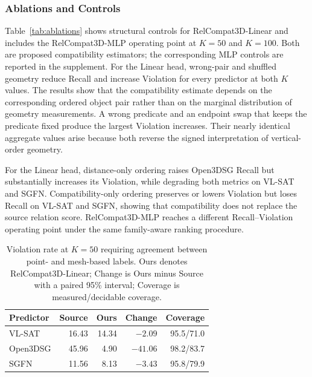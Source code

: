 \subsubsection{Ablations and Controls}
Table~\ref{tab:ablations} shows structural controls for RelCompat3D-Linear and includes the RelCompat3D-MLP operating point at $K=50$ and $K=100$. Both are proposed compatibility estimators; the corresponding MLP controls are reported in the supplement. For the Linear head, wrong-pair and shuffled geometry reduce Recall and increase Violation for every predictor at both $K$ values. The results show that the compatibility estimate depends on the corresponding ordered object pair rather than on the marginal distribution of geometry measurements. A wrong predicate and an endpoint swap that keeps the predicate fixed produce the largest Violation increases. Their nearly identical aggregate values arise because both reverse the signed interpretation of vertical-order geometry. 

For the Linear head, distance-only ordering raises Open3DSG Recall but substantially increases its Violation, while degrading both metrics on VL-SAT and SGFN. Compatibility-only ordering preserves or lowers Violation but loses Recall on VL-SAT and SGFN, showing that compatibility does not replace the source relation score. RelCompat3D-MLP reaches a different Recall--Violation operating point under the same family-aware ranking procedure. 

\begin{table}[t]
    \centering
    {\small
    \setlength{\tabcolsep}{1.5pt}
    \begin{tabular}{@{}lrrrr@{}}
    \toprule
    Predictor & Source & Ours & Change & Coverage \\
    \midrule
    VL-SAT   & 16.43 & 14.34 & $-2.09$ & 95.5/71.0 \\
    Open3DSG & 45.96 & 4.90  & $-41.06$ & 98.2/83.7 \\
    SGFN     & 11.56 & 8.13  & $-3.43$ & 95.8/79.9 \\
    \bottomrule
    \end{tabular}
    }
    \caption{Violation rate at $K=50$ requiring agreement between point- and mesh-based labels. Ours denotes RelCompat3D-Linear; Change is Ours minus Source with a paired 95\% interval; Coverage is measured/decidable coverage.}
    \label{tab:surface-audit}
\end{table}

